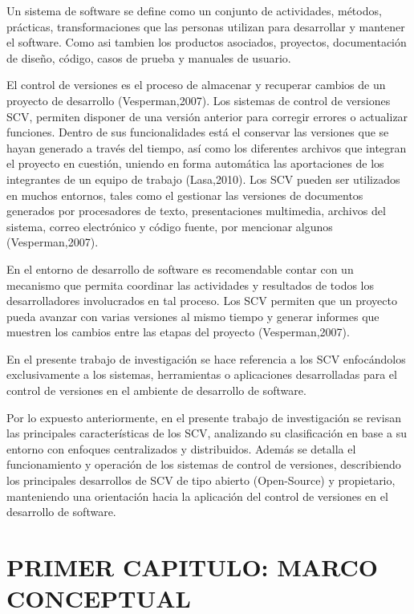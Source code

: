\documentclass[a4paper,12pt]{article}
\begin{document}
{Un sistema de software se define como un conjunto de actividades, métodos, prácticas, transformaciones que las personas utilizan para desarrollar y mantener el software. Como asi tambien los productos
asociados, proyectos, documentación de diseño, código, casos de prueba y manuales de usuario.

El control de versiones es el proceso de almacenar y recuperar cambios de un proyecto de desarrollo (Vesperman,2007). Los sistemas de control de versiones SCV, permiten disponer de una versión anterior para corregir errores o actualizar funciones. Dentro de sus funcionalidades está el conservar las versiones que se hayan generado a través del tiempo, así como los diferentes archivos que integran el proyecto en cuestión, uniendo en forma automática las aportaciones de los integrantes de un equipo de trabajo (Lasa,2010). Los SCV pueden ser utilizados en muchos entornos, tales como el gestionar las versiones de documentos generados por procesadores de texto, presentaciones multimedia, archivos del sistema, correo electrónico y código fuente, por mencionar algunos (Vesperman,2007).

En el entorno de desarrollo de software es recomendable contar con un mecanismo que permita
coordinar las actividades y resultados de todos los desarrolladores involucrados en tal proceso. Los SCV permiten que un proyecto pueda avanzar con varias
versiones al mismo tiempo y generar informes que muestren los cambios entre las etapas del proyecto (Vesperman,2007).

En el presente trabajo de investigación se hace referencia a los SCV enfocándolos exclusivamente a
los sistemas, herramientas o aplicaciones desarrolladas para el control de versiones en el ambiente de desarrollo de software.

Por lo expuesto anteriormente, en el presente trabajo de investigación se revisan las principales
características de los SCV, analizando su clasificación en base a su entorno con enfoques centralizados y distribuidos. Además se detalla el funcionamiento y operación de los sistemas de control de versiones, describiendo los principales desarrollos de SCV de tipo abierto (Open-Source) y propietario, manteniendo una orientación hacia la aplicación del control de versiones en el desarrollo de software.



\section{PRIMER CAPITULO: MARCO CONCEPTUAL}


}
\end{document}
